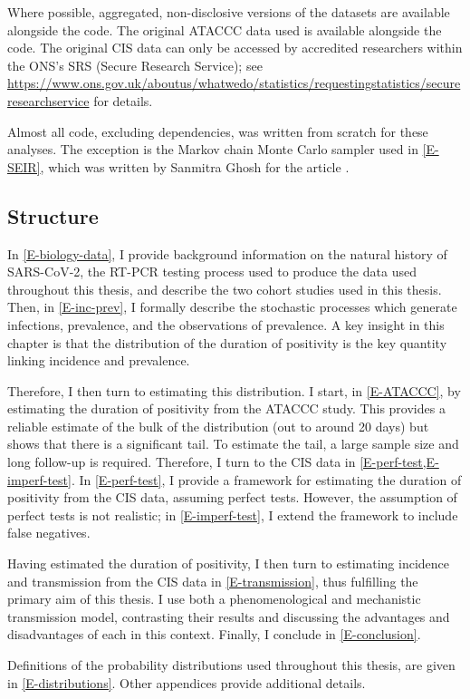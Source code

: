 \documentclass[thesis.tex]{subfiles}
\begin{document}
Where possible, aggregated, non-disclosive versions of the datasets are available alongside the code.
The original ATACCC data used is available alongside the code.
The original CIS data can only be accessed by accredited researchers within the ONS's SRS (Secure Research Service); see \url{https://www.ons.gov.uk/aboutus/whatwedo/statistics/requestingstatistics/secureresearchservice} for details.

Almost all code, excluding dependencies, was written from scratch for these analyses.
The exception is the Markov chain Monte Carlo sampler used in \cref{E-SEIR}, which was written by Sanmitra Ghosh for the article \textcite{ghoshApproximate}.

\subsection{Structure}

In \cref{E-biology-data}, I provide background information on the natural history of SARS-CoV-2, the RT-PCR testing process used to produce the data used throughout this thesis, and describe the two cohort studies used in this thesis.
Then, in \cref{E-inc-prev}, I formally describe the stochastic processes which generate infections, prevalence, and the observations of prevalence.
A key insight in this chapter is that the distribution of the duration of positivity is the key quantity linking incidence and prevalence.

Therefore, I then turn to estimating this distribution.
I start, in \cref{E-ATACCC}, by estimating the duration of positivity from the ATACCC study.
This provides a reliable estimate of the bulk of the distribution (out to around 20 days) but shows that there is a significant tail.
To estimate the tail, a large sample size and long follow-up is required.
Therefore, I turn to the CIS data in \cref{E-perf-test,E-imperf-test}.
In \cref{E-perf-test}, I provide a framework for estimating the duration of positivity from the CIS data, assuming perfect tests.
However, the assumption of perfect tests is not realistic; in \cref{E-imperf-test}, I extend the framework to include false negatives.

Having estimated the duration of positivity, I then turn to estimating incidence and transmission from the CIS data in \cref{E-transmission}, thus fulfilling the primary aim of this thesis.
I use both a phenomenological and mechanistic transmission model, contrasting their results and discussing the advantages and disadvantages of each in this context.
Finally, I conclude in \cref{E-conclusion}.

Definitions of the probability distributions used throughout this thesis, are given in \cref{E-distributions}.
Other appendices provide additional details.

\ifSubfilesClassLoaded{
  \appendix
%   
  \listoftodos
}{}
\end{document}
